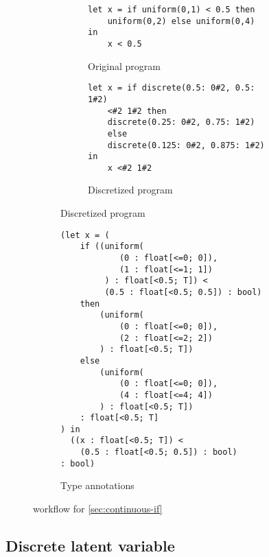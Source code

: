 \documentclass[acmsmall,screen,dvipsnames,x11names,nonacm,anonymous,review]{acmart}
\newcommand{\contdice}{\text{\scshape ContDice}\xspace}
\begin{document}
\begin{figure}[ht]
\centering
\begin{subfigure}[t]{0.48\textwidth}  %
  \centering
  \begin{subfigure}[t]{\textwidth}
    \begin{lstlisting}
let x = if uniform(0,1) < 0.5 then 
    uniform(0,2) else uniform(0,4) in 
    x < 0.5
    \end{lstlisting}
    \caption{Original program}
    \label{fig:subA}
  \end{subfigure}

  \vspace{2em} %

  \begin{subfigure}[t]{\textwidth}
    \begin{lstlisting}
let x = if discrete(0.5: 0#2, 0.5: 1#2) 
    <#2 1#2 then 
    discrete(0.25: 0#2, 0.75: 1#2) 
    else
    discrete(0.125: 0#2, 0.875: 1#2) in
    x <#2 1#2
    \end{lstlisting}
    \caption{Discretized program}
    \label{fig:subC}
  \end{subfigure}
\end{subfigure}
\hfill
\begin{subfigure}[t]{0.48\textwidth}
\begin{lstlisting}
(let x = (
    if ((uniform(
            (0 : float[<=0; 0]), 
            (1 : float[<=1; 1])
         ) : float[<0.5; T]) < 
         (0.5 : float[<0.5; 0.5]) : bool) 
    then
        (uniform(
            (0 : float[<=0; 0]), 
            (2 : float[<=2; 2])
        ) : float[<0.5; T])
    else
        (uniform(
            (0 : float[<=0; 0]), 
            (4 : float[<=4; 4])
        ) : float[<0.5; T])
    : float[<0.5; T]
) in
  ((x : float[<0.5; T]) < 
    (0.5 : float[<0.5; 0.5]) : bool) 
: bool)
\end{lstlisting}

  \caption{Type annotations}
  \label{fig:subB}
\end{subfigure}

\caption{\contdice workflow for \ref{sec:continuous-if}}
\label{fig:main}
\end{figure}

\subsection{Discrete latent variable}
\label{sec:discrete-latent}
\end{document}
